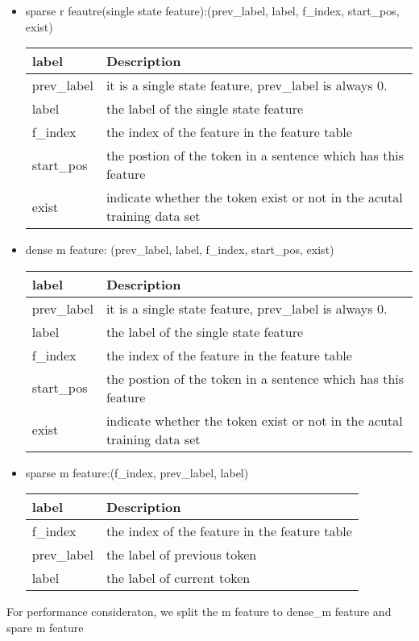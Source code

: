 \begin{itemize}

\item 
sparse r feautre(single state feature):(prev\_label, label, f\_index, start\_pos, exist)

\begin{center}
    \begin{tabular}{ | l | l |}
    \hline
    label & Description \\ \hline
    prev\_label & it is a single state feature, prev\_label is always 0.\\ 
    label       & the label of the single state feature\\
    f\_index    & the index of the feature in the feature table\\
    start\_pos  & the postion of the token in a sentence which has this feature\\
    exist       & indicate whether the token exist or not in the acutal training data set\\
    \hline
    \end{tabular}
\end{center}

\item 
dense m feature:
(prev\_label, label, f\_index, start\_pos, exist)
\begin{center}
    \begin{tabular}{ | l | l |}
    \hline
    label & Description \\ \hline
    prev\_label & it is a single state feature, prev\_label is always 0.\\ 
    label       & the label of the single state feature\\
    f\_index    &  the index of the feature in the feature table\\
    start\_pos  & the postion of the token in a sentence which has this feature\\
    exist       & indicate whether the token exist or not in the acutal training data set\\
    \hline
    \end{tabular}
\end{center}

\item 
sparse m feature:(f\_index, prev\_label, label)
\begin{center}
    \begin{tabular}{ | l | l |}
    \hline
    label & Description \\ \hline
    f\_index    &  the index of the feature in the feature table\\
    prev\_label &  the label of previous token \\
    label       &  the label of current token\\
    \hline
    \end{tabular}
\end{center}

\end{itemize}
For performance consideraton, we split the m feature to dense\_m feature and spare m feature\\


